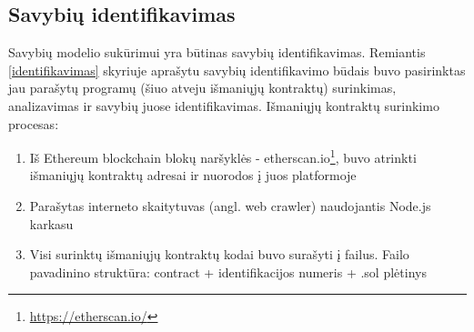\documentclass{VUMIFPSkursinis}
\begin{document}
\subsection{Savybių identifikavimas} \label{isskyrimas}

Savybių modelio sukūrimui yra būtinas savybių identifikavimas. Remiantis \ref{identifikavimas} skyriuje aprašytu savybių identifikavimo būdais buvo pasirinktas jau parašytų programų (šiuo atveju išmaniųjų kontraktų) surinkimas, analizavimas ir savybių juose identifikavimas. Išmaniųjų kontraktų surinkimo procesas:
\begin{enumerate}
\item Iš Ethereum blockchain blokų naršyklės - etherscan.io\footnote{\url{https://etherscan.io/}}, buvo atrinkti išmaniųjų kontraktų adresai ir nuorodos į juos platformoje
\item Parašytas interneto skaitytuvas (angl. web crawler) naudojantis Node.js karkasu
\item Visi surinktų išmaniųjų kontraktų kodai buvo surašyti į failus. Failo pavadinino struktūra: contract + identifikacijos numeris + .sol plėtinys
\end{enumerate}
\end{document}
